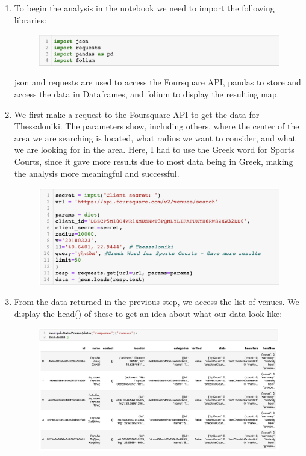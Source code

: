 \documentclass[11pt]{article}
\begin{document}
\begin{enumerate}

\item To begin the analysis in the notebook we need to import the following libraries: 
\begin{figure}[htbp]
\centerline{\includegraphics[scale=0.5]{libs.png}}
\end{figure}
\break json and requests are used to access the Foursquare API, pandas to store and access the data in Dataframes, and folium to display the resulting map.

\item We first make a request to the Foursquare API to get the data for Thessaloniki. The parameters show, including others, where the center of the area we are searching is located, what radius we want to consider, and what we are looking for in the area. Here, I had to use the Greek word for Sports Courts, since it gave more results due to most data being in Greek, making the analysis more meaningful and successful.
\begin{figure}[htbp]
\centerline{\includegraphics[scale=0.5]{1.png}}
\end{figure}
\pagebreak

\item From the data returned in the previous step, we access the list of venues. We display the head() of these to get an idea about what our data look like:
\begin{figure}[htbp]
\centerline{\includegraphics[scale=0.3]{2.png}}
\end{figure}


\end{enumerate}
\end{document}
